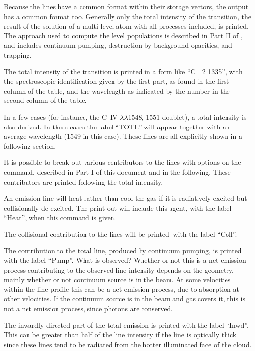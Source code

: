 Because the lines have a common format within their storage vectors,
the output has a common format too.
Generally only the total intensity
of the transition, the result of the solution of a multi-level atom with
all processes included, is printed.
The approach used to compute the level
populations is described in Part II of \Hazy,
and includes continuum pumping,
destruction by background opacities, and trapping.

The total intensity of the transition is printed in a form like ``C~~2 1335'', with the spectroscopic identification given by the first part,
as found in the first column of the table, and the wavelength as indicated
by the number in the second column of the table.

In a few cases (for instance, the C~IV $\lambda \lambda $1548, 1551 doublet), a total
intensity is also derived.
In these cases the label ``TOTL'' will appear
together with an average wavelength (1549 in this case).
These lines are
all explicitly shown in a following section.

It is possible to break out various contributors to the lines with options
on the  command, described in Part I of this document and in the
following.
These contributors are printed following the total intensity.

  An emission line will heat
rather than cool the gas
if it is radiatively excited but collisionally de-excited.
The print out
will include this agent, with the label ``Heat'',
when this command is given.

  The collisional contribution
to the lines will
be printed, with the label ``Coll''.

  The contribution to the total line, produced by continuum
pumping, is printed with the label ``Pump''.   What is observed?  Whether
or not this is a net emission process contributing to the observed line
intensity depends on the geometry, mainly whether or not continuum source
is in the beam. At some velocities within the line profile this can be a
net emission process, due to absorption at other velocities.   If the
continuum source is in the beam and gas covers it, this is not a net emission
process, since photons are conserved.

  The inwardly directed part of the total emission is
printed with the label ``Inwd''.  This can be greater than half of the line
intensity if the line is optically thick since these lines tend to be
radiated from the hotter illuminated face of the cloud.

